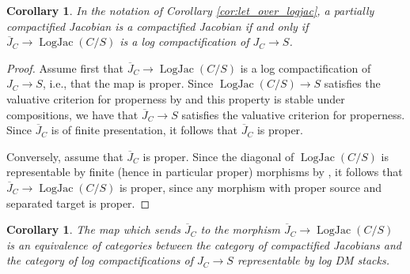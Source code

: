 \documentclass[11pt]{amsart}
\newtheorem{corollary}[theorem]{Corollary}
\theoremstyle{definition}
\theoremstyle{remark}
\DeclareMathOperator{\LogJac}{LogJac}
\begin{document}
\begin{corollary}
	\label{cor:cpt_iff_cpt_jac}
	In the notation of Corollary \ref{cor:let_over_logjac}, a partially compactified Jacobian
	is a compactified Jacobian if and only if $\overline{J}_C\to \LogJac(C/S)$ is a log compactification
	of $J_C\to S$.
\end{corollary}

\begin{proof}
	Assume first that $\overline{J}_C\to \LogJac(C/S)$ is a log compactification of $J_C\to S$, i.e., that the
	map is proper. Since $\LogJac(C/S)\to S$ satisfies the valuative
	criterion for properness by \cite[Theorem 4.10.1]{TheLogarithmicMolcho2022}
	and this property is stable under compositions, we have that
	$\overline{J}_C\to S$ satisfies the valuative criterion for
	properness. Since $\overline{J}_C$ is of finite presentation,
	it follows that $\overline{J}_C$ is proper.

	Conversely, assume that $\overline{J}_C$ is proper. Since
	the diagonal of $\LogJac(C/S)$ is representable by
	finite (hence in particular proper) morphisms by \cite[Theorem 4.12.1]{TheLogarithmicMolcho2022},
	it follows that $\overline{J}_C\to \LogJac(C/S)$ is proper,
	since any morphism with proper source and separated target
	is proper.
\end{proof}

\begin{corollary}
	\label{cor:equiv_cat_cptfd_jacs}
	The map which sends $\overline{J}_C$ to the morphism
	$\overline{J}_C\to \LogJac(C/S)$ is an equivalence of categories
	between the category of compactified Jacobians
	and the category of log compactifications of $J_C\to S$
	representable by log DM stacks.
\end{corollary}
\end{document}
